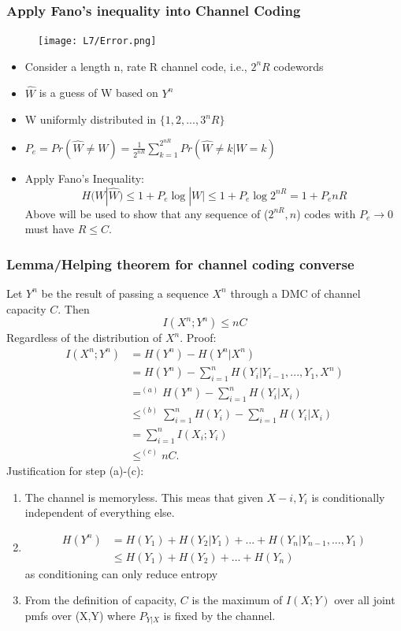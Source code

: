\documentclass[12pt]{article}
\begin{document}
\subsubsection{Apply Fano's inequality into Channel Coding}
\begin{figure}[H]
    \centering
    \texttt{[image: L7/Error.png]}
\end{figure}
\begin{itemize}
    \item Consider a length n, rate R channel code, i.e., $2^nR$ codewords 
    \item $\hat{W}$ is a guess of W based on $Y^n$
    \item W uniformly distributed in $\{1,2,...,3^nR \}$
    \item $P_e = Pr(\hat{W}\not = W) = \frac{1}{2^{nR}} \sum_{k=1}^{2^{nR}} Pr(\hat{W}\not = k |W=k)$
    \item Apply Fano's Inequality:
    \[
    H(W|\hat{W}) \le 1 + P_e\log|W| \le 1 + P_e\log2^{nR} = 1+P_enR
    \]
    Above will be used to show that any sequence of ($2^{nR},n$) codes with $P_e \rightarrow 0$ must have $R\le C$.                         
\end{itemize}

\subsubsection{Lemma/Helping theorem for channel coding converse}
Let $Y^n$ be the result of passing a sequence $X^n$ through a DMC of channel capacity $C$. Then
\[
I(X^n;Y^n) \le nC
\]
Regardless of the distribution of $X^n$. Proof:
\begin{align*}
    I(X^n;Y^n) &= H(Y^n) - H(Y^n|X^n) \\
    &= H(Y^n) - \sum_{i=1}^n H(Y_i|Y_{i-1},...,Y_1,X^n)\\
    &=^{(a)} H(Y^n) -\sum_{i=1}^n H(Y_i|X_i)\\
    &\le^{(b)} \sum_{i=1}^n H(Y_i) -\sum_{i=1}^n H(Y_i|X_i)\\
    &= \sum_{i=1}^n I(X_i;Y_i) \\
    &\le^{(c)} nC.
\end{align*}
Justification for step (a)-(c):
\begin{enumerate}[label=(\alph*)]
    \item The channel is memoryless. This meas that given $X-i,Y_i$ is conditionally independent of everything else.
    \item
\begin{align*}
    H(Y^n) &= H(Y_1) + H(Y_2|Y_1)+...+H(Y_n|Y_{n-1},...,Y_1)\\
        &\le H(Y_1) + H(Y_2) +...+ H(Y_n)
\end{align*}
    as conditioning can only reduce entropy
    \item From the definition of capacity, $C$ is the maximum of $I(X;Y)$ over all joint pmfs over (X,Y) where ${P_{Y|X}}$ is fixed by the channel.
\end{enumerate}
\end{document}

